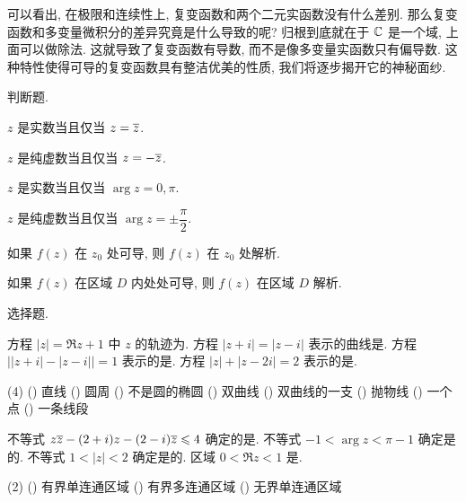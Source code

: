 可以看出, 在极限和连续性上, 复变函数和两个二元实函数没有什么差别.
那么复变函数和多变量微积分的差异究竟是什么导致的呢?
归根到底就在于 ${\mathbb{C}}$ 是一个域, 上面可以做除法.
这就导致了复变函数有\alert{导数}, 而不是像多变量实函数只有偏导数.
这种特性使得可导的复变函数具有整洁优美的性质, 我们将逐步揭开它的神秘面纱.

\begin{homework}
  \item 判断题.
    \begin{exlist}
      \item $z$ 是实数当且仅当 $z=\overline z$. \fillbrace{}
      \item $z$ 是纯虚数当且仅当 $z=-\overline z$. \fillbrace{}
      \item $z$ 是实数当且仅当 $\arg z=0,\pi$. \fillbrace{}
      \item $z$ 是纯虚数当且仅当 $\arg z=\pm\dfrac\pi2$. \fillbrace{}
      \item 如果 $f(z)$ 在 $z_0$ 处可导, 则 $f(z)$ 在 $z_0$ 处解析. \fillbrace{}
      \item 如果 $f(z)$ 在区域 $D$ 内处处可导, 则 $f(z)$ 在区域 $D$ 解析. \fillbrace{}
    \end{exlist}
  \item 选择题.
    \begin{exlist}
      \item \begin{tasks}
        \task 方程 $|z|=\Re z+1$ 中 $z$ 的轨迹为\fillbrace{}.
        \task 方程 $|z+i|=|z-i|$ 表示的曲线是\fillbrace{}.
        \task 方程 $\bigl||z+i|-|z-i|\bigr|=1$ 表示的是\fillbrace{}.
        \task 方程 $|z|+|z-2i|=2$ 表示的是\fillbrace{}.
      \end{tasks}
        \begin{taskschoice}(4)
          () 直线
          () 圆周
          () 不是圆的椭圆
          () 双曲线
          () 双曲线的一支
          () 抛物线
          () 一个点
          () 一条线段
        \end{taskschoice}
      \item \begin{tasks}
        \task 不等式 $z\overline z-(2+i)z-(2-i)\overline z\leqslant 4$ 确定的是\fillbrace{}.
        \task 不等式 $-1<\arg z<\pi-1$ 确定是的\fillbrace{}.
        \task 不等式 $1<|z|<2$ 确定是的\fillbrace{}.
        \task 区域 $0<\Re z<1$ 是\fillbrace{}.
      \end{tasks}
        \begin{taskschoice}(2)
          () 有界单连通区域
          () 有界多连通区域
          () 无界单连通区域

\end{taskschoice}
\end{exlist}
\end{homework}
